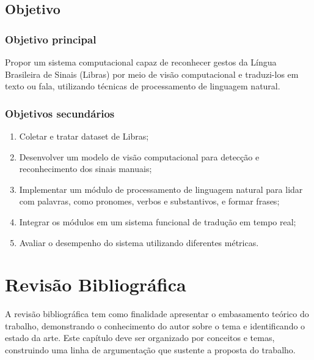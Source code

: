 \documentclass[
    12pt,                %
    openright,           %
    oneside,             %
    a4paper,             %
    english,             %
    brazil               %
]{abntex2}
\begin{document}
\section{Objetivo}
\label{sec:objetivo}

\subsection{Objetivo principal}

Propor um sistema computacional capaz de reconhecer gestos da Língua Brasileira de Sinais (Libras) por meio de visão computacional e traduzi-los em texto ou fala, utilizando técnicas de processamento de linguagem natural.

\subsection{Objetivos secundários}

\begin{enumerate}
    \item Coletar e tratar dataset de Libras;
    \item Desenvolver um modelo de visão computacional para detecção e reconhecimento dos sinais manuais;
    \item Implementar um módulo de processamento de linguagem natural para lidar com palavras, como pronomes, verbos e substantivos, e formar frases;
    \item Integrar os módulos em um sistema funcional de tradução em tempo real;
    \item Avaliar o desempenho do sistema utilizando diferentes métricas.
\end{enumerate}

\chapter{Revisão Bibliográfica}
\label{cap:revisao}

A revisão bibliográfica tem como finalidade apresentar o embasamento teórico do trabalho, demonstrando o conhecimento do autor sobre o tema e identificando o estado da arte. Este capítulo deve ser organizado por conceitos e temas, construindo uma linha de argumentação que sustente a proposta do trabalho.
\end{document}
